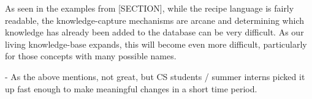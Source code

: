 As seen in the examples from [SECTION], while the recipe language is fairly
readable, the knowledge-capture mechanisms are arcane and determining which
knowledge has already been added to the database can be very difficult. As our
living knowledge-base expands, this will become even more difficult,
particularly for those concepts with many possible names.

  - As the above mentions, not great, but CS students / summer interns picked it 
    up fast enough to make meaningful changes in a short time period.
